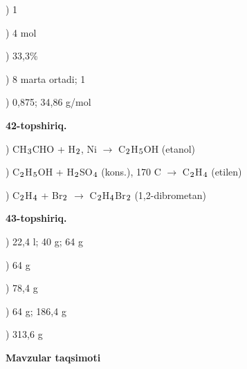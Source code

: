\documentclass[11pt,a4paper]{article}
\renewcommand{\textsubscript}[1]{\ensuremath{_{\text{\fontsize{8}{8}\selectfont #1}}}}
\begin{document}
) 1\par
{}) 4 mol\par
{}) 33,3\%\par
{}) 8 marta ortadi; 1\par
{}) 0,875; 34,86 g/mol\par
\noindent\textbf{42-topshiriq.}\par
{}) CH\textsubscript{3}CHO + H\textsubscript{2}, Ni $\to$ C\textsubscript{2}H\textsubscript{5}OH (etanol)\par
{}) C\textsubscript{2}H\textsubscript{5}OH + H\textsubscript{2}SO\textsubscript{4} (kons.), 170 \textdegree{}C $\to$ C\textsubscript{2}H\textsubscript{4} (etilen)\par
{}) C\textsubscript{2}H\textsubscript{4} + Br\textsubscript{2} $\to$ C\textsubscript{2}H\textsubscript{4}Br\textsubscript{2} (1,2-dibrometan)\par
\noindent\textbf{43-topshiriq.}\par
{}) 22,4 l; 40 g; 64 g\par
{}) 64 g\par
{}) 78,4 g\par
{}) 64 g; 186,4 g\par
{}) 313,6 g\par
\par\bigskip\noindent\textbf{Mavzular taqsimoti}\par\smallskip
\end{document}
